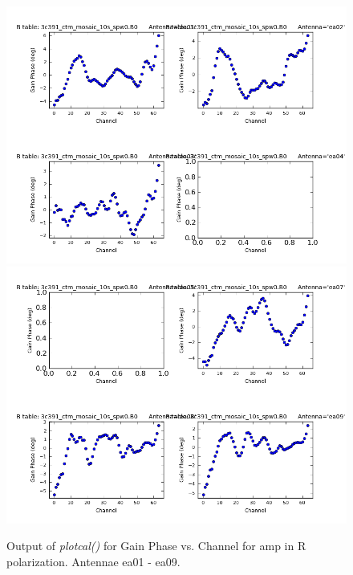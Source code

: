 \documentclass[12pt, a4paper]{article}
\begin{document}
\begin{figure}[h!]
\centering
\includegraphics[scale=0.65]{../Imaging/plots2/part4-subE-question3b_phase_pol-R-ea01-ea04.png}
\includegraphics[scale=0.65]{../Imaging/plots2/part4-subE-question3b_phase_pol-R-ea05-ea09.png}
\caption{Output of \emph{plotcal()} for Gain Phase vs. Channel for amp in R polarization. Antennae ea01 - ea09.}
\end{figure}
\addtocounter{figure}{-1}
\end{document}
